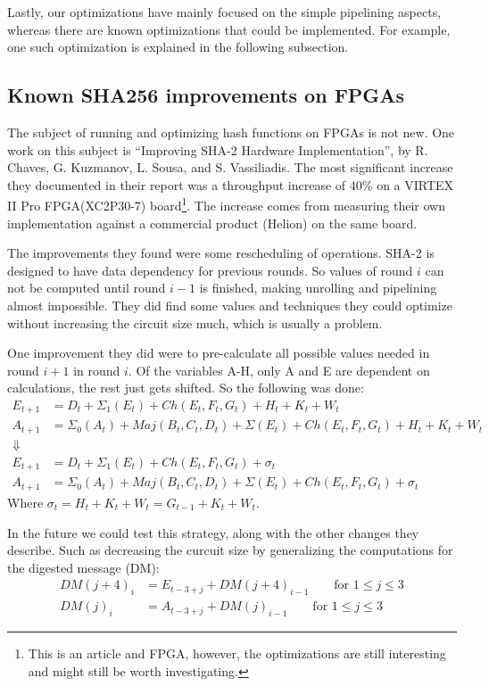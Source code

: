 \documentclass[a4paper, openany]{book}
\begin{document}
Lastly, our optimizations have mainly focused on the simple pipelining aspects, whereas there are known optimizations that could be implemented.
For example, one such optimization is explained in the following subsection.
\subsection{Known SHA256 improvements on FPGAs}
\label{sec:org528ff35}
\label{sec:SHAimprovements}
The subject of running and optimizing hash functions on FPGAs is not new. One work on this subject is ``Improving SHA-2 Hardware Implementation'', by R. Chaves, G. Kuzmanov, L. Sousa, and S. Vassiliadis.
The most significant increase they documented in their report was a throughput increase of 40\% on a VIRTEX II Pro FPGA(XC2P30-7) board\footnote{This is an article and FPGA, however, the optimizations are still interesting and might still be worth investigating.}.
The increase comes from measuring their own implementation against a commercial product (Helion) on the same board.

The improvements they found were some rescheduling of operations. SHA-2 is designed to have data dependency for previous rounds.
So values of round \(i\) can not be computed until round \(i-1\) is finished, making unrolling and pipelining almost impossible.
They did find some values and techniques they could optimize without increasing the circuit size much, which is usually a problem.

One improvement they did were to pre-calculate all possible values needed in round \(i+1\) in round \(i\).
Of the variables A-H, only A and E are dependent on calculations, the rest just gets shifted. So the following was done:
\begin{align}
E_{t+1} &= D_t+\Sigma_1(E_t)+Ch(E_t,F_t,G_t)+H_t+K_t+W_t\\
A_{t+1} &= \Sigma_0(A_t)+Maj(B_t,C_t,D_t)+\Sigma(E_t)+Ch(E_t,F_t,G_t)+H_t+K_t+W_t\\
\Downarrow\\
E_{t+1} &= D_t+\Sigma_1(E_t)+Ch(E_t,F_t,G_t)+\sigma_t\\
A_{t+1} &= \Sigma_0(A_t)+Maj(B_t,C_t,D_t)+\Sigma(E_t)+Ch(E_t,F_t,G_t)+\sigma_t
\end{align}
Where \(\sigma_t = H_t + K_t + W_t = G_{t-1} + K_t + W_t\).

In the future we could test this strategy, along with the other changes they describe. Such as decreasing the curcuit size by generalizing the computations for the digested message (DM):
\begin{align}
DM(j+4)_i &= E_{t-3+j} + DM(j+4)_{i-1}\qquad \text{for } 1\leq j \leq 3\\
DM(j)_i &= A_{t-3+j} + DM(j)_{i-1}\qquad \text{for } 1\leq j \leq 3
\end{align}
\end{document}
